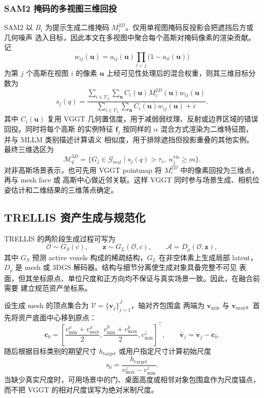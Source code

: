 \subsubsection{SAM2 掩码的多视图三维回投}

SAM2 以 $B_i$ 为提示生成二维掩码 $M_i^{2D}$。仅用单视图掩码反投影会把遮挡后方或几何噪声
选入目标，因此本文在多视图中聚合每个高斯对掩码像素的渲染贡献。记
\begin{equation}
  w_{ij}(\mathbf{u})=a_{ij}(\mathbf{u})
  \prod_{l<j}\bigl(1-a_{il}(\mathbf{u})\bigr)
\end{equation}
为第 $j$ 个高斯在视图 $i$ 的像素 $\mathbf{u}$ 上经可见性处理后的混合权重，则其三维目标分数为
\begin{equation}
  s_j(q)=
  \frac{\sum_{i\in\mathcal{V}_q}\sum_{\mathbf{u}}
  C_i(\mathbf{u})M_i^{2D}(\mathbf{u})w_{ij}(\mathbf{u})}
  {\sum_{i\in\mathcal{V}_q}\sum_{\mathbf{u}}
  C_i(\mathbf{u})w_{ij}(\mathbf{u})+\varepsilon}.
\end{equation}
其中 $C_i(\mathbf{u})$ 复用 VGGT 几何置信度，用于减弱弱纹理、反射或边界区域的错误回投。同时将每个高斯
的实例特征 $\mathbf f_j$ 按同样的 $\alpha$ 混合方式渲染为二维特征图，并与 MLLM 类别描述计算语义
相似度，用于排除遮挡但投影重叠的其他实例。最终三维选区为
\begin{equation}
  \mathcal{M}_q^{3D}=\{G_j\in\mathcal{G}_{\mathrm{real}}
  \mid s_j(q)>\tau_s,\ n_j^{\mathrm{vis}}\geq m\}.
\end{equation}
对非高斯场景表示，也可先用 VGGT pointmap 将 $M_i^{2D}$ 中的像素回投为三维点，再与 mesh face 或
高斯中心做近邻关联。这样 VGGT 同时参与场景生成、相机位姿估计和二维结果的三维落点确定。

\subsection{TRELLIS 资产生成与规范化}

TRELLIS 的两阶段生成过程可写为
\begin{equation}
  \mathcal{O}\sim G_S(c),\qquad
  \mathbf{z}\sim G_L(\mathcal{O},c),\qquad
  \mathcal{A}=D_{\rho}(\mathcal{O},\mathbf{z}),
\end{equation}
其中 $G_S$ 预测 active voxels 构成的稀疏结构，$G_L$ 在非空体素上生成局部
latent，$D_{\rho}$ 是 mesh 或 3DGS 解码器。结构与细节分离使生成对象具备完整不可见
表面，但其坐标原点、单位尺度和正方向均不保证与真实场景一致。因此，在融合前需要
建立规范资产坐标系。

设生成 mesh 的顶点集合为 $\mathcal{V}=\{\mathbf{v}_j\}_{j=1}^{J}$，轴对齐包围盒
两端为 $\mathbf{v}_{\min}$ 与 $\mathbf{v}_{\max}$。首先将资产底面中心移到原点：
\begin{equation}
  \mathbf{c}_{b}
  =\left[
  \frac{v_{\min}^{x}+v_{\max}^{x}}{2},
  \frac{v_{\min}^{y}+v_{\max}^{y}}{2},
  v_{\min}^{z}
  \right]^{\top},
  \qquad
  \bar{\mathbf{v}}_j=\mathbf{v}_j-\mathbf{c}_{b}.
\end{equation}
随后根据目标类别的期望尺寸 $h_{\mathrm{target}}$ 或用户指定尺寸计算初始尺度
\begin{equation}
  s_0=\frac{h_{\mathrm{target}}}
  {v_{\max}^{z}-v_{\min}^{z}}.
\end{equation}
当缺少真实尺度时，可用场景中的门、桌面高度或相邻对象包围盒作为尺度锚点，而不把
VGGT 的相对尺度误写为绝对米制尺度。

